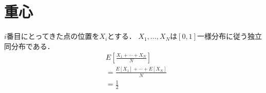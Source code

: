 \section{重心}
$i$番目にとってきた点の位置を$X_i$とする．
$X_1, \ldots, X_N$は$[0,1]$一様分布に従う独立同分布である．
\begin{align*}
  &E\left[\frac{X_1 + \cdots + X_N}{N}\right]\\
  &= \frac{E[X_1] + \cdots + E[X_N]}{N}\\
  &= \frac12
\end{align*}
